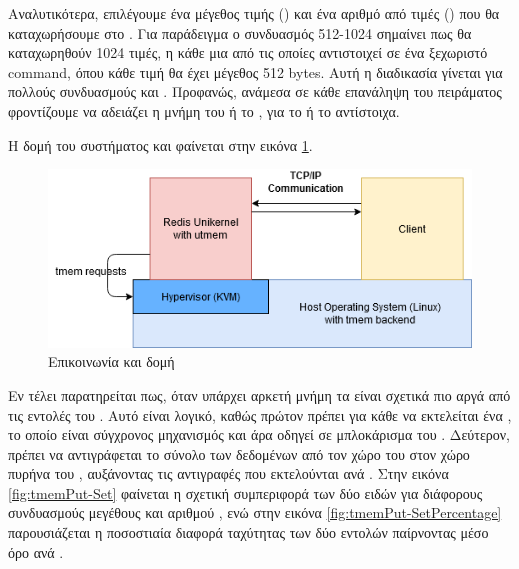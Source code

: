 Αναλυτικότερα, επιλέγουμε ένα μέγεθος τιμής () και ένα αριθμό από
τιμές () που θα καταχωρήσουμε στο .
Για παράδειγμα ο συνδυασμός 512-1024 σημαίνει πως θα
καταχωρηθούν 1024 τιμές, η κάθε μια από τις οποίες αντιστοιχεί σε ένα ξεχωριστό command,
όπου κάθε τιμή θα έχει μέγεθος 512 bytes. Αυτή η διαδικασία γίνεται για πολλούς συνδυασμούς
 και . Προφανώς, ανάμεσα σε κάθε επανάληψη του πειράματος φροντίζουμε
να αδειάζει η μνήμη του  ή το , για
το  ή το  αντίστοιχα.
\newline

Η δομή του συστήματος  και  φαίνεται στην εικόνα
\ref{fig:benchSetup}.
\newline

\begin{figure}[h]
  \includegraphics[width=\textwidth]{pictures/benchmarkSetup.png}
  \caption{Επικοινωνία και δομή }
  \label{fig:benchSetup}
\end{figure}

Εν τέλει παρατηρείται πως, όταν υπάρχει αρκετή μνήμη τα  είναι σχετικά
πιο αργά από τις  εντολές του . Αυτό είναι λογικό,
καθώς πρώτον πρέπει για κάθε  να
εκτελείται ένα , το οποίο είναι σύγχρονος μηχανισμός
και άρα οδηγεί σε μπλοκάρισμα του . Δεύτερον, πρέπει
να αντιγράφεται το σύνολο των δεδομένων από τον χώρο του
 στον χώρο πυρήνα του , αυξάνοντας τις αντιγραφές που
εκτελούνται ανά . Στην εικόνα \ref{fig:tmemPut-Set} φαίνεται
η σχετική συμπεριφορά των δύο ειδών  για διάφορους συνδυασμούς μεγέθους 
και αριθμού , ενώ στην εικόνα \ref{fig:tmemPut-SetPercentage} παρουσιάζεται η ποσοστιαία
διαφορά ταχύτητας των δύο εντολών παίρνοντας μέσο όρο ανά .
\newline

